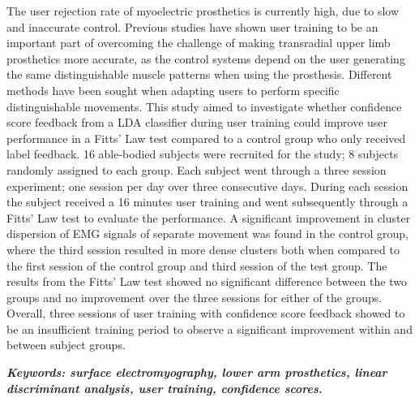

The user rejection rate of myoelectric prosthetics is currently high, due to slow and inaccurate control. Previous studies have shown user training to be an important part of overcoming the challenge of making transradial upper limb prosthetics more accurate, as the control systems depend on the user generating the same distinguishable muscle patterns when using the prosthesis. Different methods have been sought when adapting users to perform specific distinguishable movements. This study aimed to investigate whether confidence score feedback from a LDA classifier during user training could improve user performance in a Fitts' Law test compared to a control group who only received label feedback. %
16 able-bodied subjects were recruited for the study; 8 subjects randomly assigned to each group. Each subject went through a three session experiment; one session per day over three consecutive days. During each session the subject received a 16 minutes user training and went subsequently through a Fitts' Law test to evaluate the performance.
A significant improvement in cluster dispersion of EMG signals of separate movement was found in the control group, where the third session resulted in more dense clusters both when compared to the first session of the control group and third session of the test group. The results from the Fitts' Law test showed no significant difference between the two groups and no improvement over the three sessions for either of the groups. Overall, three sessions of user training with confidence score feedback showed to be an insufficient training period to observe a significant improvement within and between subject groups.

\textit{\textbf{Keywords: surface electromyography, lower arm prosthetics, linear discriminant analysis, user training, confidence scores.}}